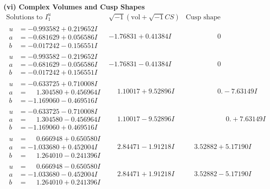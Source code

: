 \documentclass[1p]{elsarticle_modified}
\theoremstyle{definition}
\newcommand{\I}{\sqrt{-1}}
\begin{document}
\newpage\flushleft \textbf{(vi) Complex Volumes and Cusp Shapes}
$$\begin{array}{c|c|c}  
\text{Solutions to }I^u_{1}& \I (\text{vol} + \sqrt{-1}CS) & \text{Cusp shape}\\
 \hline 
\begin{aligned}
u &= -0.993582 + 0.219652 I \\
a &= -0.681629 + 0.056586 I \\
b &= -0.017242 - 0.156551 I\end{aligned}
 & -1.76831 + 0.41384 I & \phantom{-0.000000 } 0 \\ \hline\begin{aligned}
u &= -0.993582 - 0.219652 I \\
a &= -0.681629 - 0.056586 I \\
b &= -0.017242 + 0.156551 I\end{aligned}
 & -1.76831 - 0.41384 I & \phantom{-0.000000 } 0 \\ \hline\begin{aligned}
u &= -0.633725 + 0.710008 I \\
a &= \phantom{-}1.304580 + 0.456964 I \\
b &= -1.169060 - 0.469516 I\end{aligned}
 & \phantom{-}1.10017 + 9.52896 I & \phantom{-0.000000 } 0. - 7.63149 I \\ \hline\begin{aligned}
u &= -0.633725 - 0.710008 I \\
a &= \phantom{-}1.304580 - 0.456964 I \\
b &= -1.169060 + 0.469516 I\end{aligned}
 & \phantom{-}1.10017 - 9.52896 I & \phantom{-0.000000 -}0. + 7.63149 I \\ \hline\begin{aligned}
u &= \phantom{-}0.666948 + 0.650580 I \\
a &= -1.033680 + 0.452004 I \\
b &= \phantom{-}1.264010 - 0.241396 I\end{aligned}
 & \phantom{-}2.84471 - 1.91218 I & \phantom{-}3.52882 + 5.17190 I \\ \hline\begin{aligned}
u &= \phantom{-}0.666948 - 0.650580 I \\
a &= -1.033680 - 0.452004 I \\
b &= \phantom{-}1.264010 + 0.241396 I\end{aligned}
 & \phantom{-}2.84471 + 1.91218 I & \phantom{-}3.52882 - 5.17190 I \\ \hline\begin{aligned}

\end{aligned}
\end{array}$$
\end{document}
